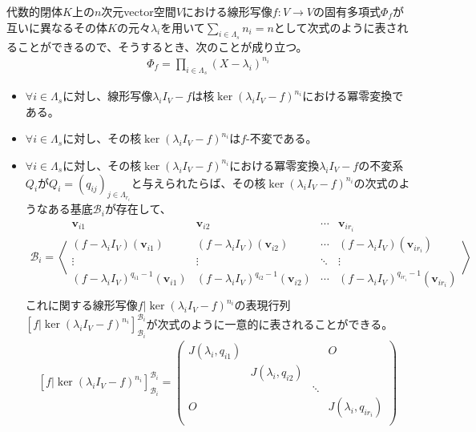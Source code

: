 \documentclass[dvipdfmx]{jsarticle}
\begin{document}
\begin{thm*}
代数的閉体$K$上の$n$次元vector空間$V$における線形写像$f:V \rightarrow V$の固有多項式$\varPhi_{f}$が互いに異なるその体$K$の元々$\lambda_{i}$を用いて$\sum_{i \in \varLambda_{s}} n_{i} = n$として次式のように表されることができるので、そうするとき、次のことが成り立つ。
\begin{align*}
\varPhi_{f} = \prod_{i \in \varLambda_{s}} \left( X - \lambda_{i} \right)^{n_{i}}
\end{align*}
\begin{itemize}
\item
  $\forall i \in \varLambda_{s}$に対し、線形写像$\lambda_{i}I_{V} - f$は核$\ker\left( \lambda_{i}I_{V} - f \right)^{n_{i}}$における冪零変換である。
\item
  $\forall i \in \varLambda_{s}$に対し、その核$\ker\left( \lambda_{i}I_{V} - f \right)^{n_{i}}$は$f$-不変である。
\item
  $\forall i \in \varLambda_{s}$に対し、その核$\ker\left( \lambda_{i}I_{V} - f \right)^{n_{i}}$における冪零変換$\lambda_{i}I_{V} - f$の不変系$Q_{i}$が$Q_{i} = \left( q_{ij} \right)_{j \in \varLambda_{r_{i}}}$と与えられたらば、その核$\ker\left( \lambda_{i}I_{V} - f \right)^{n_{i}}$の次式のようなある基底$\mathcal{B}_{i}$が存在して、
\begin{align*}
\mathcal{B}_{i} = \left\langle \begin{matrix}
\mathbf{v}_{i1} & \mathbf{v}_{i2} & \cdots & \mathbf{v}_{ir_{i}} \\
\left( f - \lambda_{i}I_{V} \right)\left( \mathbf{v}_{i1} \right) & \left( f - \lambda_{i}I_{V} \right)\left( \mathbf{v}_{i2} \right) & \cdots & \left( f - \lambda_{i}I_{V} \right)\left( \mathbf{v}_{ir_{i}} \right) \\
  \vdots & \vdots & \ddots & \vdots \\
\left( f - \lambda_{i}I_{V} \right)^{q_{i1} - 1}\left( \mathbf{v}_{i1} \right) & \left( f - \lambda_{i}I_{V} \right)^{q_{i2} - 1}\left( \mathbf{v}_{i2} \right) & \cdots & \left( f - \lambda_{i}I_{V} \right)^{q_{ir_{i}} - 1}\left( \mathbf{v}_{ir_{i}} \right) \\
\end{matrix} \right\rangle
\end{align*}
これに関する線形写像$f|\ker\left( \lambda_{i}I_{V} - f \right)^{n_{i}}$の表現行列$\left[ f|\ker\left( \lambda_{i}I_{V} - f \right)^{n_{i}} \right]_{\mathcal{B}_{i}}^{\mathcal{B}_{i}}$が次式のように一意的に表されることができる。
\begin{align*}
\left[ f|\ker\left( \lambda_{i}I_{V} - f \right)^{n_{i}} \right]_{\mathcal{B}_{i}}^{\mathcal{B}_{i}} = \begin{pmatrix}
J\left( \lambda_{i},q_{i1} \right) & \  & \  & O \\
\  & J\left( \lambda_{i},q_{i2} \right) & \  & \  \\
\  & \  & \ddots & \  \\
O & \  & \  & J\left( \lambda_{i},q_{ir_{i}} \right) \\
\end{pmatrix}
\end{align*}
\end{itemize}
\end{thm*}
\end{document}
